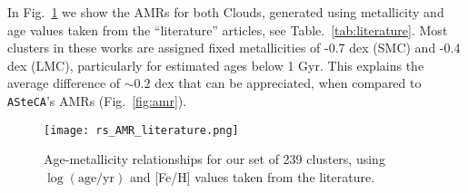 \documentclass{aa}
\begin{document}
\begin{appendix}



In Fig.~\ref{fig:amr_lit} we show the AMRs for both Clouds, generated using
metallicity and age values taken from the ``literature'' articles, see
Table.~\ref{tab:literature}.
Most clusters in these works are assigned fixed metallicities of -0.7 dex (SMC)
and -0.4 dex (LMC), particularly for estimated ages below 1 Gyr. This explains
the average difference of ${\sim}0.2$ dex that can be appreciated, when compared
to \texttt{ASteCA}'s AMRs (Fig.~\ref{fig:amr}).

\begin{figure}
\centering
\texttt{[image: rs\_AMR\_literature.png]}
\caption{Age-metallicity relationships for our set of 239 clusters, using
$\log\mathrm{(age/yr)}$ and [Fe/H] values taken from the literature.}
\label{fig:amr_lit}
\end{figure}

\end{appendix} 
\end{document}
